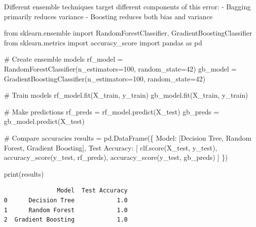 \documentclass[
  letterpaper,
  DIV=11,
  numbers=noendperiod]{scrreprt}
\newenvironment{Shaded}{\begin{snugshade}}{\end{snugshade}}
\newcommand{\BuiltInTok}[1]{\textcolor[rgb]{0.00,0.23,0.31}{#1}}
\newcommand{\CommentTok}[1]{\textcolor[rgb]{0.37,0.37,0.37}{#1}}
\newcommand{\DecValTok}[1]{\textcolor[rgb]{0.68,0.00,0.00}{#1}}
\newcommand{\ImportTok}[1]{\textcolor[rgb]{0.00,0.46,0.62}{#1}}
\newcommand{\NormalTok}[1]{\textcolor[rgb]{0.00,0.23,0.31}{#1}}
\newcommand{\OperatorTok}[1]{\textcolor[rgb]{0.37,0.37,0.37}{#1}}
\newcommand{\StringTok}[1]{\textcolor[rgb]{0.13,0.47,0.30}{#1}}
\begin{document}
Different ensemble techniques target different components of this error:
- Bagging primarily reduces variance - Boosting reduces both bias and
variance

\begin{Shaded}
\begin{Highlighting}[]
\ImportTok{from}\NormalTok{ sklearn.ensemble }\ImportTok{import}\NormalTok{ RandomForestClassifier, GradientBoostingClassifier}
\ImportTok{from}\NormalTok{ sklearn.metrics }\ImportTok{import}\NormalTok{ accuracy\_score}
\ImportTok{import}\NormalTok{ pandas }\ImportTok{as}\NormalTok{ pd}

\CommentTok{\# Create ensemble models}
\NormalTok{rf\_model }\OperatorTok{=}\NormalTok{ RandomForestClassifier(n\_estimators}\OperatorTok{=}\DecValTok{100}\NormalTok{, random\_state}\OperatorTok{=}\DecValTok{42}\NormalTok{)}
\NormalTok{gb\_model }\OperatorTok{=}\NormalTok{ GradientBoostingClassifier(n\_estimators}\OperatorTok{=}\DecValTok{100}\NormalTok{, random\_state}\OperatorTok{=}\DecValTok{42}\NormalTok{)}

\CommentTok{\# Train models}
\NormalTok{rf\_model.fit(X\_train, y\_train)}
\NormalTok{gb\_model.fit(X\_train, y\_train)}

\CommentTok{\# Make predictions}
\NormalTok{rf\_preds }\OperatorTok{=}\NormalTok{ rf\_model.predict(X\_test)}
\NormalTok{gb\_preds }\OperatorTok{=}\NormalTok{ gb\_model.predict(X\_test)}

\CommentTok{\# Compare accuracies}
\NormalTok{results }\OperatorTok{=}\NormalTok{ pd.DataFrame(\{}
    \StringTok{\textquotesingle{}Model\textquotesingle{}}\NormalTok{: [}\StringTok{\textquotesingle{}Decision Tree\textquotesingle{}}\NormalTok{, }\StringTok{\textquotesingle{}Random Forest\textquotesingle{}}\NormalTok{, }\StringTok{\textquotesingle{}Gradient Boosting\textquotesingle{}}\NormalTok{],}
    \StringTok{\textquotesingle{}Test Accuracy\textquotesingle{}}\NormalTok{: [}
\NormalTok{        clf.score(X\_test, y\_test),}
\NormalTok{        accuracy\_score(y\_test, rf\_preds),}
\NormalTok{        accuracy\_score(y\_test, gb\_preds)}
\NormalTok{    ]}
\NormalTok{\})}

\BuiltInTok{print}\NormalTok{(results)}
\end{Highlighting}
\end{Shaded}

\begin{verbatim}
               Model  Test Accuracy
0      Decision Tree            1.0
1      Random Forest            1.0
2  Gradient Boosting            1.0
\end{verbatim}
\end{document}
